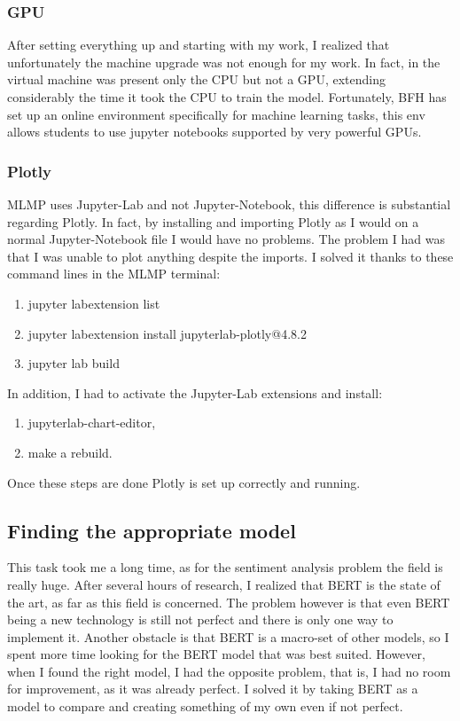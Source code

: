 \subsubsection{GPU}
After setting everything up and starting with my work, I realized that unfortunately the machine upgrade was not enough for my work.
In fact, in the virtual machine was present only the CPU but not a GPU, extending considerably the time it took the CPU to train the model.
Fortunately, BFH has set up an online environment specifically for machine learning tasks, this env allows students to use jupyter notebooks supported by very powerful GPUs.

\subsubsection{Plotly}
MLMP uses Jupyter-Lab and not Jupyter-Notebook, this difference is substantial regarding Plotly. In fact, by installing and importing Plotly as I would on a normal Jupyter-Notebook file I would have no problems.
The problem I had was that I was unable to plot anything despite the imports.
I solved it thanks to these command lines in the MLMP terminal:
\begin{enumerate}
    \item jupyter labextension list
    \item jupyter labextension install jupyterlab-plotly@4.8.2
    \item jupyter lab build
\end{enumerate}

In addition, I had to activate the Jupyter-Lab extensions and install:
\begin{enumerate}
    \item jupyterlab-chart-editor,
    \item make a rebuild.
\end{enumerate}

Once these steps are done Plotly is set up correctly and running.

\subsection{Finding the appropriate model}
This task took me a long time, as for the sentiment analysis problem the field is really huge.
After several hours of research, I realized that BERT is the state of the art, as far as this field is concerned.
The problem however is that even BERT being a new technology is still not perfect and there is only one way to implement it.
Another obstacle is that BERT is a macro-set of other models, so I spent more time looking for the BERT model that was best suited.
However, when I found the right model, I had the opposite problem, that is, I had no room for improvement, as it was already perfect. 
I solved it by taking BERT as a model to compare and creating something of my own even if not perfect.

